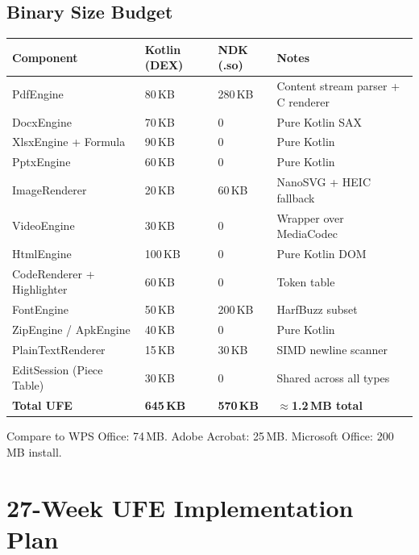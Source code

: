 \documentclass[11pt, a4paper, openright]{report}
\begin{document}
\section{Binary Size Budget}

\begin{longtable}{@{}p{40mm}p{24mm}p{24mm}p{52mm}@{}}
\toprule
\textbf{Component} & \textbf{Kotlin (DEX)} & \textbf{NDK (.so)} & \textbf{Notes} \\
\midrule
PdfEngine & 80\,KB & 280\,KB & Content stream parser + C renderer \\
DocxEngine & 70\,KB & 0 & Pure Kotlin SAX \\
XlsxEngine + Formula & 90\,KB & 0 & Pure Kotlin \\
PptxEngine & 60\,KB & 0 & Pure Kotlin \\
ImageRenderer & 20\,KB & 60\,KB & NanoSVG + HEIC fallback \\
VideoEngine & 30\,KB & 0 & Wrapper over MediaCodec \\
HtmlEngine & 100\,KB & 0 & Pure Kotlin DOM \\
CodeRenderer + Highlighter & 60\,KB & 0 & Token table \\
FontEngine & 50\,KB & 200\,KB & HarfBuzz subset \\
ZipEngine / ApkEngine & 40\,KB & 0 & Pure Kotlin \\
PlainTextRenderer & 15\,KB & 30\,KB & SIMD newline scanner \\
EditSession (Piece Table) & 30\,KB & 0 & Shared across all types \\
\midrule
\textbf{Total UFE} & \textbf{645\,KB} & \textbf{570\,KB} & \textbf{$\approx$1.2\,MB total} \\
\bottomrule
\end{longtable}

Compare to WPS Office: 74\,MB. Adobe Acrobat: 25\,MB. Microsoft Office: 200\,MB install.

\chapter{27-Week UFE Implementation Plan}
\end{document}
